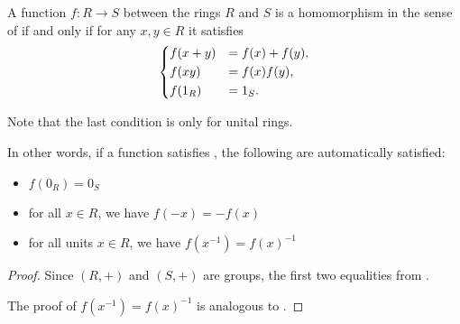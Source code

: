 \begin{proposition}\label{thm:ring_homomorphism_simpler_conditions}
  A function \( f: R \to S \) between the rings \( R \) and \( S \) is a homomorphism in the sense of  if and only if for any \( x, y \in R \) it satisfies
  \begin{equation}\label{thm:ring_homomorphism_simpler_conditions/condition}
    \begin{dcases}
      f(x + y) &= f(x) + f(y), \\
      f(xy) &= f(x) f(y), \\
      f(1_R) &= 1_S.
    \end{dcases}
  \end{equation}

  Note that the last condition is only for unital rings.

  In other words, if a function satisfies , the following are automatically satisfied:
  \begin{itemize}
    \item \( f(0_R) = 0_S \)
    \item for all \( x \in R \), we have \( f(-x) = -f(x) \)
    \item for all units \( x \in R \), we have \( f(x^{-1}) = f(x)^{-1} \)
  \end{itemize}
\end{proposition}
\begin{proof}
  Since \( (R, +) \) and \( (S, +) \) are groups, the first two equalities from .

  The proof of \( f(x^{-1}) = f(x)^{-1} \) is analogous to .
\end{proof}

